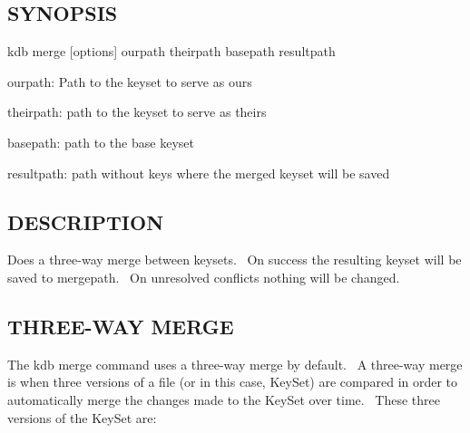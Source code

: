 \subsection*{S\+Y\+N\+O\+P\+S\+IS}

{\ttfamily kdb merge \mbox{[}options\mbox{]} ourpath theirpath basepath resultpath}~\newline



\begin{DoxyItemize}
\item ourpath\+: Path to the keyset to serve as {\ttfamily ours}~\newline

\item theirpath\+: path to the keyset to serve as {\ttfamily theirs}~\newline

\item basepath\+: path to the {\ttfamily base} keyset~\newline

\item resultpath\+: path without keys where the merged keyset will be saved~\newline

\end{DoxyItemize}

\subsection*{D\+E\+S\+C\+R\+I\+P\+T\+I\+ON}

Does a three-\/way merge between keysets.~\newline
 On success the resulting keyset will be saved to mergepath.~\newline
 On unresolved conflicts nothing will be changed.~\newline


\subsection*{T\+H\+R\+E\+E-\/\+W\+AY M\+E\+R\+GE}

The {\ttfamily kdb merge} command uses a three-\/way merge by default.~\newline
 A three-\/way merge is when three versions of a file (or in this case, Key\+Set) are compared in order to automatically merge the changes made to the Key\+Set over time.~\newline
 These three versions of the Key\+Set are\+:~\newline




